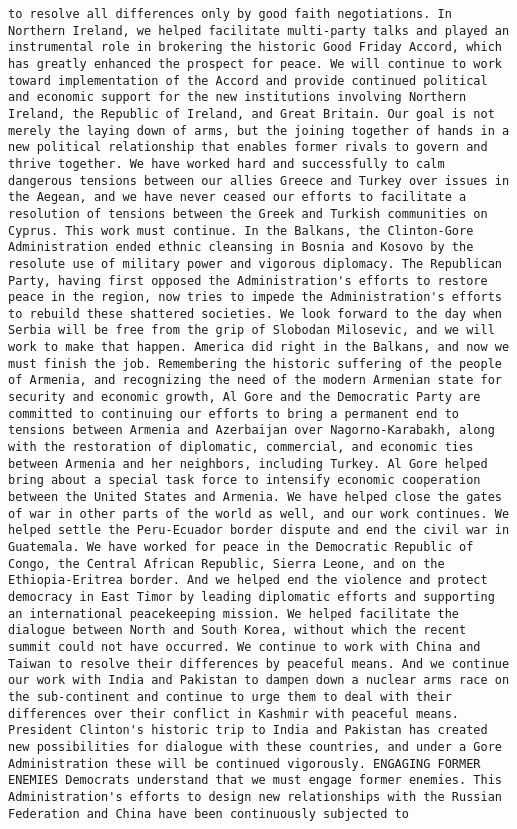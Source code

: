 \documentclass[
]{article}
\begin{document}
\begin{verbatim}
to resolve all differences only by good faith negotiations. In Northern Ireland, we helped facilitate multi-party talks and played an instrumental role in brokering the historic Good Friday Accord, which has greatly enhanced the prospect for peace. We will continue to work toward implementation of the Accord and provide continued political and economic support for the new institutions involving Northern Ireland, the Republic of Ireland, and Great Britain. Our goal is not merely the laying down of arms, but the joining together of hands in a new political relationship that enables former rivals to govern and thrive together. We have worked hard and successfully to calm dangerous tensions between our allies Greece and Turkey over issues in the Aegean, and we have never ceased our efforts to facilitate a resolution of tensions between the Greek and Turkish communities on Cyprus. This work must continue. In the Balkans, the Clinton-Gore Administration ended ethnic cleansing in Bosnia and Kosovo by the resolute use of military power and vigorous diplomacy. The Republican Party, having first opposed the Administration's efforts to restore peace in the region, now tries to impede the Administration's efforts to rebuild these shattered societies. We look forward to the day when Serbia will be free from the grip of Slobodan Milosevic, and we will work to make that happen. America did right in the Balkans, and now we must finish the job. Remembering the historic suffering of the people of Armenia, and recognizing the need of the modern Armenian state for security and economic growth, Al Gore and the Democratic Party are committed to continuing our efforts to bring a permanent end to tensions between Armenia and Azerbaijan over Nagorno-Karabakh, along with the restoration of diplomatic, commercial, and economic ties between Armenia and her neighbors, including Turkey. Al Gore helped bring about a special task force to intensify economic cooperation between the United States and Armenia. We have helped close the gates of war in other parts of the world as well, and our work continues. We helped settle the Peru-Ecuador border dispute and end the civil war in Guatemala. We have worked for peace in the Democratic Republic of Congo, the Central African Republic, Sierra Leone, and on the Ethiopia-Eritrea border. And we helped end the violence and protect democracy in East Timor by leading diplomatic efforts and supporting an international peacekeeping mission. We helped facilitate the dialogue between North and South Korea, without which the recent summit could not have occurred. We continue to work with China and Taiwan to resolve their differences by peaceful means. And we continue our work with India and Pakistan to dampen down a nuclear arms race on the sub-continent and continue to urge them to deal with their differences over their conflict in Kashmir with peaceful means. President Clinton's historic trip to India and Pakistan has created new possibilities for dialogue with these countries, and under a Gore Administration these will be continued vigorously. ENGAGING FORMER ENEMIES Democrats understand that we must engage former enemies. This Administration's efforts to design new relationships with the Russian Federation and China have been continuously subjected to 
\end{verbatim}
\end{document}
